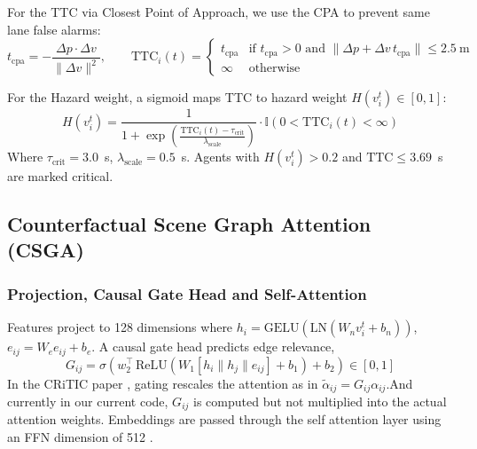 \documentclass[preprint,12pt]{elsarticle}
\begin{document}
For the TTC via Closest Point of Approach, we use the CPA to prevent same lane false alarms:
\begin{equation}
    t_{\text{cpa}} = -\frac{\Delta{p} \cdot \Delta{v}}{\|\Delta{v}\|^2}, \qquad
    \text{TTC}_i(t) = \begin{cases}
    t_{\text{cpa}} & \text{if } t_{\text{cpa}} > 0 \text{ and } \|\Delta{p} + \Delta{v}\, t_{\text{cpa}}\| \le 2.5~\text{m} \\
    \infty & \text{otherwise}
    \end{cases}
    \label{eq_ttc}
\end{equation}

For the Hazard weight, a sigmoid maps TTC to hazard weight $H(v_i^t) \in [0,1]$:
\begin{equation}
    H(v_i^t) = \frac{1}{1 + \exp\left(\frac{\text{TTC}_i(t) - \tau_{\text{crit}}}{\lambda_{\text{scale}}}\right)} \cdot \mathbb{I}\left(0 < \text{TTC}_i(t) < \infty\right)
    \label{eq_hazard}
\end{equation}
Where $\tau_{\text{crit}} = 3.0$~s, $\lambda_{\text{scale}} = 0.5$~s. Agents with $H(v_i^t) > 0.2$ and $\text{TTC} \le 3.69$~s are marked critical.

\subsection{Counterfactual Scene Graph Attention (CSGA)}
\subsubsection{Projection, Causal Gate Head and Self-Attention}
Features project to 128 dimensions where ${h}_i = \text{GELU}(\text{LN}({W}_n v_i^t + {b}_n))$, ${e}_{ij} = {W}_e e_{ij} + {b}_e$. A causal gate head predicts edge relevance,
\begin{equation}
    G_{ij} = \sigma\left({w}_2^\top \, \text{ReLU}\left({W}_1 \left[{h}_i \| {h}_j \| {e}_{ij}\right] + {b}_1\right) + b_2\right) \in [0, 1]
    \label{eq_gate}
\end{equation}
In the CRiTIC \cite{ahmadi2025critic} paper , gating rescales the attention as in $\tilde{\alpha}_{ij} = G_{ij} \alpha_{ij}$.And currently in our current code, $G_{ij}$ is computed but not multiplied into the actual attention weights. Embeddings are passed through the self attention layer using an FFN dimension of 512 \cite{vaswani2017attention}.
\end{document}

